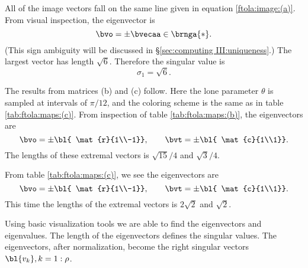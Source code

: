 All of the image vectors fall on the same line given in equation \eqref{ftola:image:(a)}. From visual inspection, the eigenvector is
\begin{equation}
  \bvo = \pm \bvecaa \in \brnga{*}.
\end{equation}
(This sign ambiguity will be discussed in \S \eqref{sec:computing III:uniqueness}.) The largest vector has length $\sqrt{6}$. Therefore the singular value is
\begin{equation}
  \sigma_{1} = \sqrt{6}.
\end{equation}

The results from matrices (b) and (c) follow. Here the lone parameter $\theta$ is sampled at intervals of $\pi / 12$, and the coloring scheme is the same as in table \eqref{tab:ftola:maps:(c)}. From inspection of table \eqref{tab:ftola:maps:(b)}, the eigenvectors are
\begin{equation}
  \bvo = \pm {\bl{ \mat{r}{1\\-1}} }, \qquad \bvt = \pm {\bl{ \mat{c}{1\\1}} }.
\end{equation}
The lengths of these extremal vectors is $\sqrt{15}/4$ and $\sqrt{3}/4$. 

From table \eqref{tab:ftola:maps:(c)}, we see the eigenvectors are
\begin{equation}
  \bvo = \pm {\bl{ \mat{r}{1\\-1}} }, \qquad \bvt = \pm {\bl{ \mat{c}{1\\1}} }.
\end{equation}
This time the lengths of the extremal vectors is $2\sqrt{2}$ and $\sqrt{2}$.

Using basic visualization tools we are able to find the eigenvectors and eigenvalues. The length of the eigenvectors defines the singular values. The eigenvectors, after normalization, become the right singular vectors ${\bl{ v_{k} }}, k=1:\rho$.

